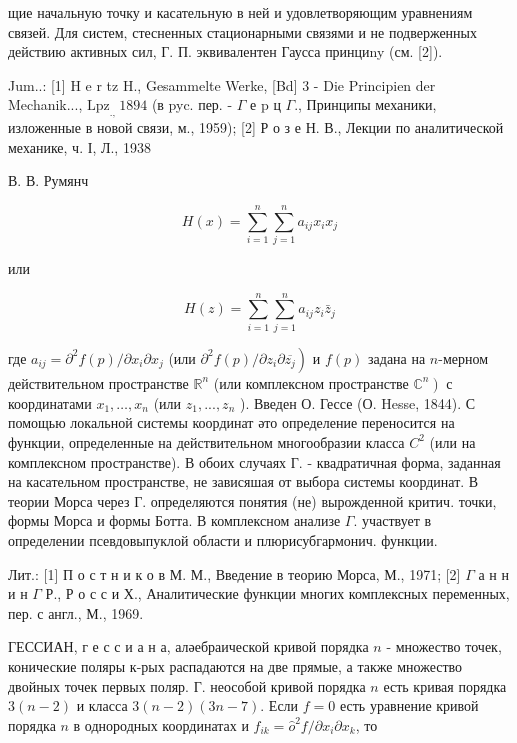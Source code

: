 \documentclass[10pt]{article}
\begin{document}
щие начальную точку и касательную в ней и удовлетворяющим уравнениям связей. Для систем, стесненных стационарными связями и не подверженных действию активных сил, Г. П. эквивалентен Гаусса принциny (см. [2]).



Jum..: [1] H e r tz H., Gesammelte Werke, [Bd] 3 - Die Principien der Mechanik..., $\mathrm{Lpz}_{\text {., }} 1894$ (в pyc. пер. - $\Gamma$ е $\mathrm{p}$ ц $\Gamma$., Принципы механики, изложенные в новой связи, м., 1959); [2] Р о з е Н. В., Лекции по аналитической механике, ч. І, Л., 1938



В. В. Румянч



\[

H(x)=\sum_{i=1}^{n} \sum_{j=1}^{n} a_{i j} x_{i} x_{j}

\]



или



\[

H(z)=\sum_{i=1}^{n} \sum_{j=1}^{n} a_{i j} z_{i} \bar{z}_{j}

\]



где $a_{i j}=\partial^{2} f(p) / \partial x_{i} \partial x_{j}$ (или $\left.\partial^{2} f(p) / \partial z_{i} \partial \overline{z_{j}}\right)$ и $f(p)$ задана на $n$-мерном действительном пространстве $\mathbb{R}^{n}$ (или комплексном пространстве $\left.\mathbb{C}^{n}\right)$ с координатами $x_{1}, \ldots, x_{n}$ (или $z_{1}, . . ., z_{n}$ ). Введен О. Гессе (О. Hesse, 1844). С помощью локальной системы координат әто определение переносится на функции, определенные на действительном многообразии класса $C^{2}$ (или на комплексном пространстве). В обоих случаях Г. - квадратичная форма, заданная на касательном пространстве, не зависяшая от выбора системы координат. В теории Морса через Г. определяются понятия (не) вырожденной критич. точки, формы Морса и формы Ботта. В комплексном анализе $\Gamma$. участвует в определении псевдовыпуклой области и плюрисубгармонич. функции.



Лит.: [1] П о с т н и к о в М. М., Введение в теорию Морса, М., 1971; [2] $\Gamma$ а н н и н $\Gamma$ Р., Р о с с и Х., Аналитические функции многих комплексных переменных, пер. с англ., М., 1969.



ГЕССИАН, г е с с и а н а, аләебраической кривой порядка $n$ - множество точек, конические поляры к-рых распадаются на две прямые, а также множество двойных точек первых поляр. Г. неособой кривой порядка $n$ есть кривая порядка $3(n-2)$ и класса $3(n-2)(3 n-7)$. Если $f=0$ есть уравнение кривой порядка $n$ в однородных координатах и $f_{i k}=\hat{o}^{2} f / \partial x_{i} \partial x_{k}$, то
\end{document}
